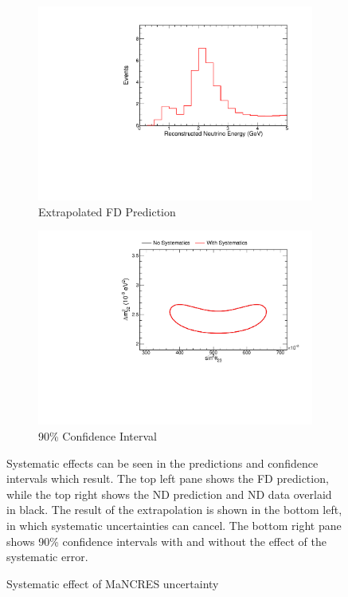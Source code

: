 {\begin{figure}
\begin{center}
\begin{subfigure}[c]{0.49\textwidth}
\includegraphics[width=\textwidth]{figures/systs/prediction/fd_extrap_prediction_MaNCRES.pdf}
\caption*{Extrapolated FD Prediction}
\end{subfigure}
\begin{subfigure}[c]{0.49\textwidth}
\includegraphics[width=\textwidth]{figures/systs/prediction/fd_extrap_contour_MaNCRES.pdf}
\caption*{90\% Confidence Interval}
\end{subfigure}
\end{center}
\caption{Systematic effect of MaNCRES uncertainty}{
Systematic effects can be seen in the predictions and confidence intervals
which result.
The top left pane shows the FD prediction, while the top right shows the
ND prediction and ND data overlaid in black.
The result of the extrapolation is shown in the bottom left, in which
systematic uncertainties can cancel.
The bottom right pane shows 90\% confidence intervals with and without
the effect of the systematic error.}
\label{syst_fig_MaNCRES}


\end{figure}}

